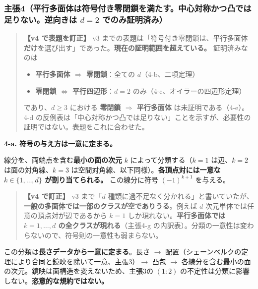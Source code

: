 \documentclass[
  10pt,
]{ltjsarticle}
\providecommand{\tightlist}{%
  \setlength{\itemsep}{0pt}\setlength{\parskip}{0pt}}
\begin{document}
\subsubsection{\texorpdfstring{主張4（平行多面体は符号付き零閉鎖を満たす。中心対称かつ凸では足りない。逆向きは
\(d=2\)
でのみ証明済み）}{主張4（平行多面体は符号付き零閉鎖を満たす。中心対称かつ凸では足りない。逆向きは d=2 でのみ証明済み）}}\label{ux4e3bux5f354ux5e73ux884cux591aux9762ux4f53ux306fux7b26ux53f7ux4ed8ux304dux96f6ux9589ux9396ux3092ux6e80ux305fux3059ux4e2dux5fc3ux5bfeux79f0ux304bux3064ux51f8ux3067ux306fux8db3ux308aux306aux3044ux9006ux5411ux304dux306f-d2-ux3067ux306eux307fux8a3cux660eux6e08ux307f}

\begin{quote}
\textbf{【v4 で表題を訂正】} v3
までの表題は「符号付き零閉鎖は、平行多面体\textbf{だけ}を選び出す」であった。\textbf{現在の証明範囲を超えている。}
証明済みなのは

\begin{itemize}
\tightlist
\item
  \textbf{平行多面体 \(\Rightarrow\) 零閉鎖}：全ての
  \(d\)（4-b、二項定理）
\item
  \textbf{零閉鎖 \(\Leftrightarrow\) 平行四辺形}：\(d=2\)
  のみ（4-c、オイラーの四辺形定理）
\end{itemize}

であり、\(d\ge3\) における \textbf{零閉鎖 \(\Rightarrow\) 平行多面体}
は未証明である（4-e）。4-d
の反例表は「中心対称かつ凸では足りない」ことを示すが、必要性の証明ではない。表題をこれに合わせた。
\end{quote}

\textbf{4-a. 符号の与え方は一意に定まる。}

線分を、両端点を含む\textbf{最小の面の次元} \(k\)
によって分類する（\(k = 1\) は辺、\(k=2\) は面の対角線、\(k=3\)
は空間対角線、以下同様）。\textbf{各頂点対には一意な
\(k \in \{1,\dots,d\}\) が割り当てられる。} この線分に符号
\((-1)^{k+1}\) を与える。

\begin{quote}
\textbf{【v4 で訂正】} v3 まで「\(d\)
種類に過不足なく分かれる」と書いていたが、\textbf{一般の多面体では一部のクラスが空でありうる}。例えば
\(d\) 次元単体では任意の頂点対が辺であるから \(k=1\)
しか現れない。\textbf{平行多面体では \(k=1,\dots,d\)
の全クラスが現れる}（主張4-g
の内訳表）。分類の一意性は変わらないので、符号則の一意性も弱まらない。
\end{quote}

この分類は\textbf{長さデータから一意に定まる}。長さ \(\to\)
配置（シェーンベルクの定理により合同と鏡映を除いて一意、主張3）\(\to\)
凸包 \(\to\)
各線分を含む最小の面の次元。鏡映は面構造を変えないため、主張3の
\((1{:}2)\) の不定性は分類に影響しない。\textbf{恣意的な規約ではない。}
\end{document}
